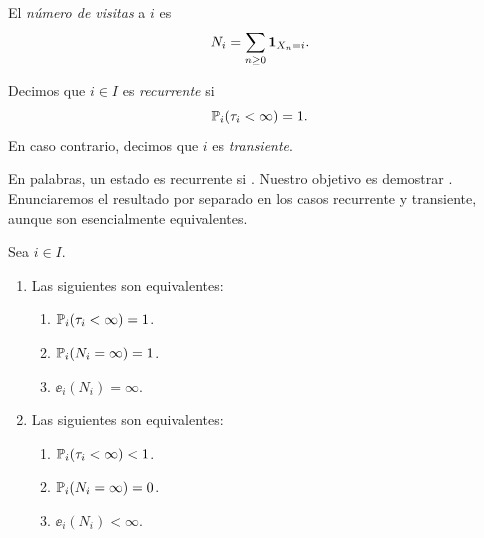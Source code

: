 \begin{defn}
El \emph{número de visitas} a $i$ es
\[N_i=\sum_{n\geq0}\mathbf{1}_{X_n=i}.\]
\end{defn}

\begin{defn}
Decimos que $i\in I$ es \emph{recurrente} si
\[\mathbb{P}_i(\tau_i<\infty)=1.\]
En caso contrario, decimos que $i$ es \emph{transiente}.
\end{defn}

En palabras, un estado es recurrente si  .
Nuestro objetivo es demostrar .
Enunciaremos el resultado por separado en los casos recurrente y transiente, aunque son esencialmente equivalentes.

\begin{thm}\label{thm:rec-trans}
Sea $i\in I$.
\begin{enumerate}[label=\uptext{\arabic*.}]
\item {}\enspace Las siguientes son equivalentes:
\begin{enumerate}[label=\uptext{(\roman*)}]
\item $\mathbb{P}_i(\tau_i<\infty)=1$.
\item $\mathbb{P}_i(N_i=\infty)=1$.
\item $\ee_i(N_i)=\infty$.
\end{enumerate}
\item {}\enspace Las siguientes son equivalentes:
\begin{enumerate}[label=\uptext{(\roman*)}]
\item $\mathbb{P}_i(\tau_i<\infty)<1$.
\item $\mathbb{P}_i(N_i=\infty)=0$.
\item $\ee_i(N_i)<\infty$.
\end{enumerate}
\end{enumerate}
\end{thm}


